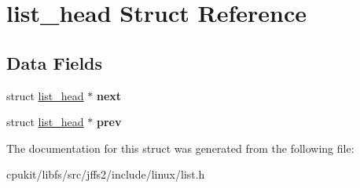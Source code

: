 \hypertarget{structlist__head}{}\section{list\+\_\+head Struct Reference}
\label{structlist__head}
\subsection*{Data Fields}
\begin{DoxyCompactItemize}
\item 
\mbox{\label{structlist__head_ac3b0ff0dfb978a0cfbdad6b9d19cdcfe}} 
struct \mbox{\hyperlink{structlist__head}{list\+\_\+head}} $\ast$ {\bfseries next}
\item 
\mbox{\label{structlist__head_ae4298f7975979e5f6bb406c40c1fa443}} 
struct \mbox{\hyperlink{structlist__head}{list\+\_\+head}} $\ast$ {\bfseries prev}
\end{DoxyCompactItemize}


The documentation for this struct was generated from the following file\+:\begin{DoxyCompactItemize}
\item 
cpukit/libfs/src/jffs2/include/linux/list.\+h\end{DoxyCompactItemize}

